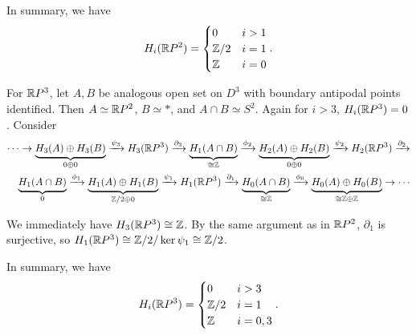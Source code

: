 \documentclass[12pt]{article}
\begin{document}
\begin{problem}[10]
In summary, we have
\begin{align*}
	H_i (\mathbb{R} P^2) = \begin{cases}
		0 & i > 1\\
		\mathbb{Z} /2 & i =1\\
		\mathbb{Z} & i = 0\\
	\end{cases}.
\end{align*}

For $ \mathbb{R} P^3$, let $ A,B$ be analogous open set on $ D^3$ with boundary antipodal points identified. Then $ A \simeq \mathbb{R} P^2$, $ B \simeq \text{*}$, and $ A \cap B \simeq S^2$. Again for $ i>3$,  $ H_i(\mathbb{R} P^3) =0$. Consider
\begin{align*}
	\cdots \to \underbrace{ H_3(A) \oplus  H_3(B)}_{ 0 \oplus 0}  \xrightarrow{ \psi_3} H_3 (\mathbb{R} P^3) \xrightarrow{ \partial_3} \underbrace{ H_1(A \cap B)}_{ \cong \mathbb{Z}} \xrightarrow{ \phi_2} \underbrace{ H_2(A) \oplus H_2(B)}_{0\oplus 0} \xrightarrow{ \psi_2} H_2(\mathbb{R} P^3) \xrightarrow{ \partial _2}\\
	\underbrace{ H_1(A \cap B)}_{0} \xrightarrow{ \phi_1} \underbrace{ H_1(A) \oplus H_1(B)}_{\mathbb{Z} /2 \oplus 0 } \xrightarrow{ \psi_1} H_1(\mathbb{R} P^3) \xrightarrow{ \partial_1}  \underbrace{ H_0(A \cap B)}_{ \cong \mathbb{Z} } \xrightarrow{ \phi_0} \underbrace{ H_0(A) \oplus H_0(B)}_{ \cong \mathbb{Z}\oplus \mathbb{Z} } \to \cdots    
\end{align*}

We immediately have $ H_3(\mathbb{R} P^3) \cong \mathbb{Z}$. By the same argument as in $ \mathbb{R} P^2$, $ \partial _1$ is surjective, so $ H_1(\mathbb{R} P^3) \cong  \mathbb{Z} /2 / \ker \psi_1 \cong \mathbb{Z} /2$.

In summary, we have
\begin{align*}
	H_i (\mathbb{R} P^3) = \begin{cases}
		0 & i > 3\\
		\mathbb{Z} /2 & i =1\\
		\mathbb{Z} & i = 0,3\\
	\end{cases}.
\end{align*}


\end{problem}
\end{document}
